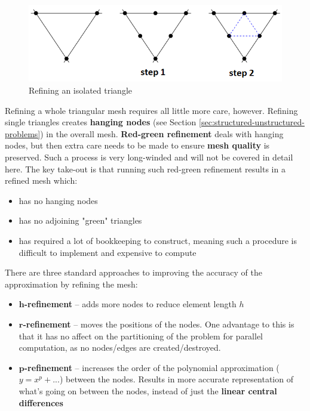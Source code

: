 \documentclass{article}
\begin{document}
\begin{figure}
	\centering
	\includegraphics[scale=0.6]{figures/single-mesh-triangulation.png}
	\caption{Refining an isolated triangle}
	\label{fig:isolated-triangle-refinement}
\end{figure}

Refining a whole triangular mesh requires all little more care, however. Refining single triangles creates \textbf{hanging nodes} (see Section \ref{sec:structured-unstructured-problems}) in the overall mesh. \textbf{Red-green refinement} deals with hanging nodes, but then extra care needs to be made to ensure \textbf{mesh quality} is preserved. Such a process is very long-winded and will not be covered in detail here. The key take-out is that running such red-green refinement results in a refined mesh which:
\begin{itemize}
	\item has no hanging nodes
	\item has no adjoining "green" triangles
	\item has required a lot of bookkeeping to construct, meaning such a procedure is difficult to implement and expensive to compute
\end{itemize}

There are three standard approaches to improving the accuracy of the approximation by refining the mesh:
\begin{itemize}
	\item \textbf{$\mathbf{h}$-refinement} -- adds more nodes to reduce element length $h$
	\item \textbf{$\mathbf{r}$-refinement} -- moves the positions of the nodes. One advantage to this is that it has no affect on the partitioning of the problem for parallel computation, as no nodes/edges are created/destroyed.
	\item \textbf{$\mathbf{p}$-refinement} -- increases the order of the polynomial approximation ($y = x^p + ...$) between the nodes. Results in more accurate representation of what's going on between the nodes, instead of just the \textbf{linear central differences}
\end{itemize}
\end{document}
